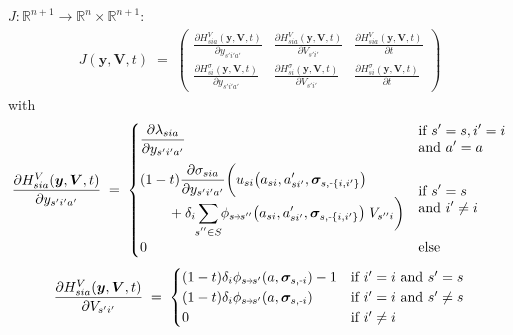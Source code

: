 \documentclass[11pt,fleqn]{article}
\newcommand{\R}{\mathbb{R}}
\newcommand{\bsigma}{\bm{\sigma}}
\newcommand{\bV}{\bm{V}}
\newcommand{\by}{\bm{y}}
\newcommand{\shortminus}{{\text{\scalebox{0.4}[1.0]{\(-\)}}}}
\newcommand{\minusi}{\shortminus i}
\newcommand{\shortrightarrow}{\parbox{4pt}{\tikz{\draw[->](0,0)--(4pt,0);}}}
\newcommand{\phiss}{\phi_{s\shortrightarrow s'}}
\begin{document}
$J: \R^{n+1} \rightarrow \R^n \times \R^{n+1}$:
\begin{align*}
	J(\by,\bV,t) \;=\; 
	\begin{pmatrix}
		\frac{ \partial H^V_{sia}(\by,\bV,t) }{ \partial y_{s'i'a'} } 
		& \frac{ \partial H^V_{sia}(\by,\bV,t) }{ \partial V_{s'i'} } 
		& \frac{ \partial H^V_{sia}(\by,\bV,t) }{ \partial t } \\[1em] 
		\frac{ \partial H^\sigma_{si}(\by,\bV,t) }{ \partial y_{s'i'a'} } 
		& \frac{ \partial H^\sigma_{si}(\by,\bV,t) }{ \partial V_{s'i'} } 
		& \frac{ \partial H^\sigma_{si}(\by,\bV,t) }{ \partial t }
	\end{pmatrix} 
\end{align*}
with
\begin{align*}
	\frac{ \partial H^V_{sia}(\by,\bV,t) }{ \partial y_{s'i'a'} } \;=\; 
	\begin{cases}
		\begin{aligned}
			& \frac{\partial \lambda_{sia}}{\partial y_{s'i'a'}}
		\end{aligned} & 
		\begin{aligned}
			& \text{if } s'=s, i'=i \\ &\text{and } a'=a
		\end{aligned} \\[1em]
		\begin{aligned}
			& (1-t) \frac{\partial \sigma_{sia}}{\partial y_{s'i'a'}} \biggl( u_{si}\bigl(a_{si},a_{si'}',\bsigma_{s,\shortminus\{i,i'\}}\bigr) \\
			& \qquad + \delta_i \sum\limits_{\mathclap{s''\in S}} \phi_{s\shortrightarrow s''}\bigl(a_{si},a_{si'}',\bsigma_{s,\shortminus\{i,i'\}}\bigr) \; V_{s''i} \biggr)
		\end{aligned} & 
		\begin{aligned}
			& \text{if } s'=s \\ &\text{and } i'\neq i 
		\end{aligned} \\[1em]
		0 & \text{else}
	\end{cases}
\end{align*}
\begin{align*}
	\frac{ \partial H^V_{sia}(\by,\bV,t) }{ \partial V_{s'i'} } \;=\;
	\begin{cases}
		(1-t) \delta_i \phiss(a,\bsigma_{s,\minusi}) - 1 &\text{if } i'=i \text{ and } s'=s \\
		(1-t) \delta_i \phiss(a,\bsigma_{s,\minusi}) &\text{if } i'=i \text{ and } s'\neq s \\
		0 &\text{if } i'\neq i
	\end{cases}
\end{align*}
\end{document}
